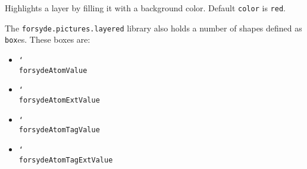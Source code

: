 \vspace{1ex}
\hspace{1pt}

\noindent Highlights a layer by filling it with a background color. Default \texttt{color} is \texttt{red}.

The  \texttt{forsyde.pictures.layered} library also holds a number of shapes defined as \texttt{box}es. These boxes are:

\begin{itemize}
\item \texttt{\char`\\forsydeAtomValue}
\item \texttt{\char`\\forsydeAtomExtValue}
\item \texttt{\char`\\forsydeAtomTagValue}
\item \texttt{\char`\\forsydeAtomTagExtValue}
\end{itemize}


